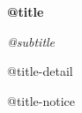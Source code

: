 \vspace*{0.12\textheight}
{\Huge\bfseries @{title}\par}
\vspace{0.6em}
{\Large\itshape @{subtitle}\par}
\vspace{0.7em}
{\large @{title-detail}\par}
\vfill
{\small @{title-notice}\par}

